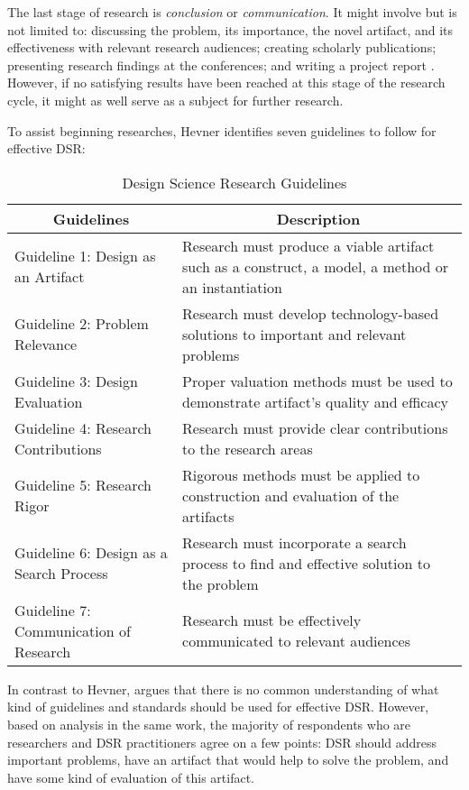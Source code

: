 The last stage of research is \textit{conclusion} or \textit{communication}. It
might involve but is not limited to: discussing the problem, its importance, the
novel artifact, and its effectiveness with relevant research audiences; creating
scholarly publications; presenting research findings at the conferences; and
writing a project report \citep{Archer1984}. However, if no satisfying results
have been reached at this stage of the research cycle, it might as well serve as
a subject for further research.

To assist beginning researches, Hevner \citeyearpar{Hevner2004} identifies seven
guidelines to follow for effective DSR:

\begin{table}[htb]
  \begin{center}
    \begin{tabular}{| l | p{6.5cm} |}
    \hline
     \multicolumn{1}{|c|}{\textbf{Guidelines}} &
     \multicolumn{1}{c|}{\textbf{Description}} \\
     \hline
     Guideline 1: Design as an Artifact & Research must produce a viable
    artifact such as a construct, a model, a method or an instantiation \\ \hline
     Guideline 2: Problem Relevance & Research must develop technology-based
     solutions to important and relevant problems \\ \hline 
     Guideline 3: Design Evaluation & Proper valuation methods must be used to
     demonstrate artifact's quality and efficacy \\ \hline 
     Guideline 4: Research Contributions & Research must provide clear
     contributions to the research areas \\ \hline 
     Guideline 5: Research Rigor & Rigorous methods must be applied to
     construction and evaluation of the artifacts \\ \hline 
     Guideline 6: Design as a Search Process & Research must incorporate a
     search process to find and effective solution to the problem \\ \hline
     Guideline 7: Communication of Research & Research must be effectively
     communicated to relevant audiences \\ \hline
    \end{tabular}
  \end{center}
  \caption{Design Science Research Guidelines \citep{Hevner2004}}
\end{table}

In contrast to Hevner, \citet{Venable2010} argues that there is no common
understanding of what kind of guidelines and standards should be used for
effective DSR. However, based on analysis in the same work, the majority of
respondents who are researchers and DSR practitioners agree on a few points: DSR
should address important problems, have an artifact that would help to solve the
problem, and have some kind of evaluation of this artifact.

